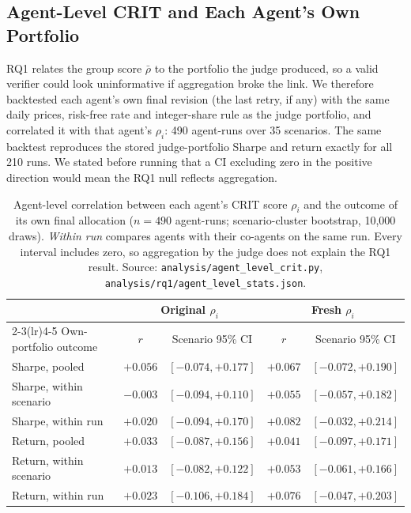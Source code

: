 \documentclass{article}
\begin{document}
\subsection{Agent-Level CRIT and Each Agent's Own Portfolio}
\label{app:agent_level}

RQ1 relates the group score $\bar{\rho}$ to the portfolio the judge produced, so a valid verifier
could look uninformative if aggregation broke the link. We therefore backtested each agent's own
final revision (the last retry, if any) with the same daily prices, risk-free rate and integer-share
rule as the judge portfolio, and correlated it with that agent's $\rho_i$: 490 agent-runs over 35
scenarios. The same backtest reproduces the stored judge-portfolio Sharpe and return exactly for all
210 runs. We stated before running that a CI excluding zero in the positive direction would mean
the RQ1 null reflects aggregation.

\begin{table}[H]
\centering\small
\begin{tabular}{lcccc}
\toprule
& \multicolumn{2}{c}{Original $\rho_i$} & \multicolumn{2}{c}{Fresh $\rho_i$} \\
\cmidrule(lr){2-3}\cmidrule(lr){4-5}
Own-portfolio outcome & $r$ & Scenario 95\% CI & $r$ & Scenario 95\% CI \\
\midrule
Sharpe, pooled          & $+0.056$ & $[-0.074,+0.177]$ & $+0.067$ & $[-0.072,+0.190]$ \\
Sharpe, within scenario & $-0.003$ & $[-0.094,+0.110]$ & $+0.055$ & $[-0.057,+0.182]$ \\
Sharpe, within run      & $+0.020$ & $[-0.094,+0.170]$ & $+0.082$ & $[-0.032,+0.214]$ \\
Return, pooled          & $+0.033$ & $[-0.087,+0.156]$ & $+0.041$ & $[-0.097,+0.171]$ \\
Return, within scenario & $+0.013$ & $[-0.082,+0.122]$ & $+0.053$ & $[-0.061,+0.166]$ \\
Return, within run      & $+0.023$ & $[-0.106,+0.184]$ & $+0.076$ & $[-0.047,+0.203]$ \\
\bottomrule
\end{tabular}
\vspace{4pt}
\caption{Agent-level correlation between each agent's CRIT score $\rho_i$ and the outcome of its own
final allocation ($n{=}490$ agent-runs; scenario-cluster bootstrap, 10{,}000 draws). \emph{Within run}
compares agents with their co-agents on the same run. Every interval includes zero, so
aggregation by the judge does not explain the RQ1 result. Source:
\texttt{analysis/agent\_level\_crit.py}, \texttt{analysis/rq1/agent\_level\_stats.json}.}
\label{tab:agent_level}
\end{table}
\end{document}
